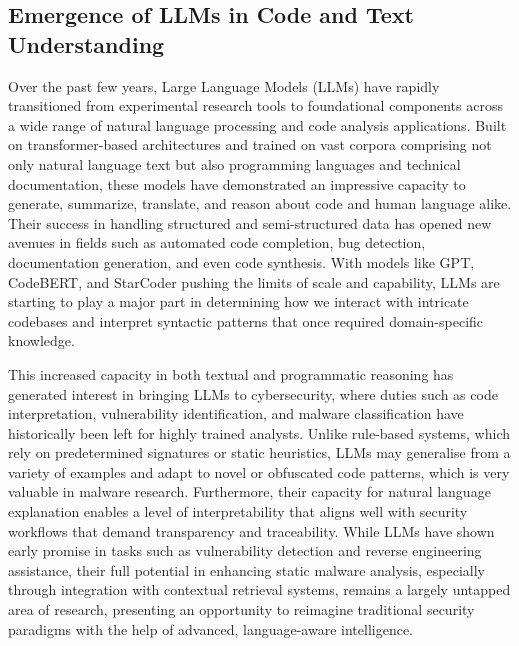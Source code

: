 \subsection{Emergence of LLMs in Code and Text Understanding}
Over the past few years, Large Language Models (LLMs) have rapidly transitioned from experimental
research tools to foundational components across a wide range of natural language processing and
code analysis applications. Built on transformer-based architectures and trained on vast corpora
comprising not only natural language text but also programming languages and technical
documentation, these models have demonstrated an impressive capacity to generate, summarize,
translate, and reason about code and human language alike. Their success in handling structured and
semi-structured data has opened new avenues in fields such as automated code completion, bug
detection, documentation generation, and even code synthesis. With models like GPT, CodeBERT, and
StarCoder pushing the limits of scale and capability, LLMs are starting to play a major part in
determining how we interact with intricate codebases and interpret syntactic patterns that once
required domain-specific knowledge.

This increased capacity in both textual and programmatic reasoning has generated interest in
bringing LLMs to cybersecurity, where duties such as code interpretation, vulnerability
identification, and malware classification have historically been left for highly trained analysts.
Unlike rule-based systems, which rely on predetermined signatures or static heuristics, LLMs may
generalise from a variety of examples and adapt to novel or obfuscated code patterns, which is very
valuable in malware research. Furthermore, their capacity for natural language explanation enables
a level of interpretability that aligns well with security workflows that demand transparency and
traceability. While LLMs have shown early promise in tasks such as vulnerability detection and
reverse engineering assistance, their full potential in enhancing static malware
analysis, especially through integration with contextual retrieval systems, remains a largely
untapped area of research, presenting an opportunity to reimagine traditional security paradigms
with the help of advanced, language-aware intelligence.

